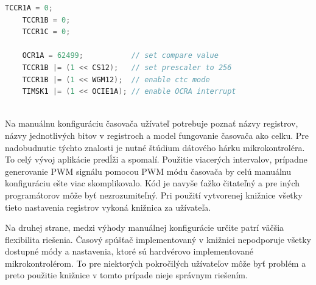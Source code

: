 \begin{lstlisting}[language=c++]      
    TCCR1A = 0;
    TCCR1B = 0;
    TCCR1C = 0;

    OCR1A = 62499;           // set compare value
    TCCR1B |= (1 << CS12);   // set prescaler to 256
    TCCR1B |= (1 << WGM12);  // enable ctc mode
    TIMSK1 |= (1 << OCIE1A); // enable OCRA interrupt
    
\end{lstlisting}

Na manuálnu konfiguráciu časovača užívateľ potrebuje poznať názvy registrov, názvy jednotlivých bitov  v registroch a model fungovanie časovača ako celku. Pre nadobudnutie
týchto znalosti je nutné štúdium dátového hárku mikrokontroléra. To celý vývoj aplikácie predĺži a spomalí. Použitie viacerých intervalov,
prípadne generovanie  PWM signálu pomocou PWM módu časovača by celú
manuálnu konfiguráciu ešte viac skomplikovalo. Kód je navyše ťažko čitateľný a pre iných programátorov
môže byť nezrozumiteľný. Pri použití vytvorenej knižnice všetky tieto nastavenia registrov vykoná knižnica za užívateľa. \par
Na druhej strane, medzi výhody manuálnej konfigurácie určite patrí väčšia flexibilita riešenia. Časový spúšťač implementovaný v knižnici nepodporuje všetky dostupné
módy a nastavenia, ktoré sú hardvérovo implementované mikrokontrolérom. To pre niektorých pokročilých užívateľov môže byť problém a preto použitie knižnice
v tomto prípade nieje správnym riešením.

